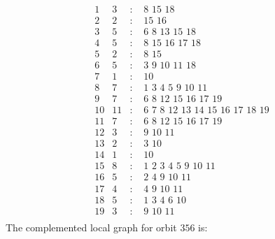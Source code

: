 \documentclass[12pt]{article}
\begin{document}
\begin{equation*}
\begin{array}{rrcl}
1&3&:&\,\,8\,\,15\,\,18\\
2&2&:&\,\,15\,\,16\\
3&5&:&\,\,6\,\,8\,\,13\,\,15\,\,18\\
4&5&:&\,\,8\,\,15\,\,16\,\,17\,\,18\\
5&2&:&\,\,8\,\,15\\
6&5&:&\,\,3\,\,9\,\,10\,\,11\,\,18\\
7&1&:&\,\,10\\
8&7&:&\,\,1\,\,3\,\,4\,\,5\,\,9\,\,10\,\,11\\
9&7&:&\,\,6\,\,8\,\,12\,\,15\,\,16\,\,17\,\,19\\
10&11&:&\,\,6\,\,7\,\,8\,\,12\,\,13\,\,14\,\,15\,\,16\,\,17\,\,18\,\,19\\
11&7&:&\,\,6\,\,8\,\,12\,\,15\,\,16\,\,17\,\,19\\
12&3&:&\,\,9\,\,10\,\,11\\
13&2&:&\,\,3\,\,10\\
14&1&:&\,\,10\\
15&8&:&\,\,1\,\,2\,\,3\,\,4\,\,5\,\,9\,\,10\,\,11\\
16&5&:&\,\,2\,\,4\,\,9\,\,10\,\,11\\
17&4&:&\,\,4\,\,9\,\,10\,\,11\\
18&5&:&\,\,1\,\,3\,\,4\,\,6\,\,10\\
19&3&:&\,\,9\,\,10\,\,11\\
\end{array}
\end{equation*}
The complemented local graph for orbit $356$ is:
\end{document}
